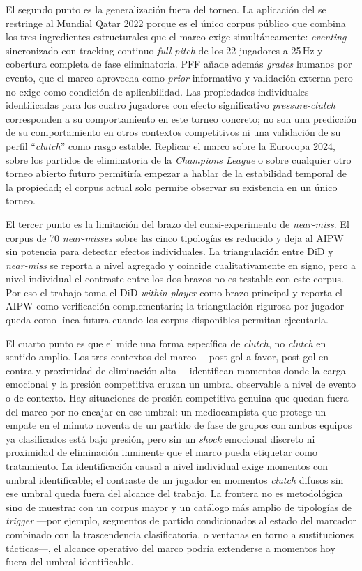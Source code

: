 El segundo punto es la generalización fuera del torneo. La aplicación
del \CCV se restringe al Mundial Qatar 2022 porque es el único corpus
público que combina los tres ingredientes estructurales que el marco
exige simultáneamente: \textit{eventing} sincronizado con tracking
continuo \textit{full-pitch} de los 22 jugadores a 25\,Hz y cobertura
completa de fase eliminatoria. PFF añade además
\textit{grades} humanos por evento, que el marco aprovecha como
\textit{prior} informativo y validación externa pero no exige como
condición de aplicabilidad. Las propiedades individuales
identificadas para los cuatro jugadores con efecto significativo
\textit{pressure-clutch} corresponden a su comportamiento en este
torneo concreto; no son una predicción de su comportamiento en otros
contextos competitivos ni una validación de su perfil ``\textit{clutch}''
como rasgo estable. Replicar el marco sobre la Eurocopa 2024, sobre
los partidos de eliminatoria de la \textit{Champions League} o sobre
cualquier otro torneo abierto futuro permitiría empezar a hablar de
la estabilidad temporal de la propiedad; el corpus actual solo
permite observar su existencia en un único torneo.

El tercer punto es la limitación del brazo del cuasi-experimento de
\textit{near-miss}. El corpus de 70 \textit{near-misses} sobre las
cinco tipologías es reducido y deja al AIPW sin potencia para
detectar efectos individuales. La triangulación entre DiD y
\textit{near-miss} se reporta a nivel agregado y coincide
cualitativamente en signo, pero a nivel individual el contraste entre
los dos brazos no es testable con este corpus. Por eso el trabajo
toma el DiD \textit{within-player} como brazo principal y reporta el
AIPW como verificación complementaria; la triangulación rigurosa por
jugador queda como línea futura cuando los corpus disponibles
permitan ejecutarla.

El cuarto punto es que el \CCV mide una forma específica de
\textit{clutch}, no \textit{clutch} en sentido amplio. Los tres
contextos del marco ---post-gol a favor, post-gol en contra y
proximidad de eliminación alta--- identifican momentos donde la carga
emocional y la presión competitiva cruzan un umbral observable a
nivel de evento o de contexto. Hay situaciones de presión competitiva
genuina que quedan fuera del marco por no encajar en ese umbral: un
mediocampista que protege un empate en el minuto noventa de un
partido de fase de grupos con ambos equipos ya clasificados está bajo
presión, pero sin un \textit{shock} emocional discreto ni proximidad
de eliminación inminente que el marco pueda etiquetar como
tratamiento. La identificación causal a nivel individual exige momentos
con umbral identificable; el contraste de un jugador en momentos
\textit{clutch} difusos sin ese umbral queda fuera del alcance del
trabajo. La frontera no es metodológica sino de muestra: con un
corpus mayor y un catálogo más amplio de tipologías de
\textit{trigger} ---por ejemplo, segmentos de partido condicionados
al estado del marcador combinado con la trascendencia clasificatoria,
o ventanas en torno a sustituciones tácticas---, el alcance operativo
del marco podría extenderse a momentos hoy fuera del umbral
identificable.

